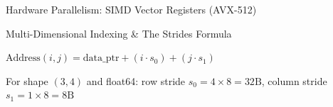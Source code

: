\begin{frame}{Hardware Parallelism: SIMD Vector Registers (AVX-512)}
  \begin{center}
    \DrawSIMDExecutionDiagram
  \end{center}
  \vfill
\end{frame}

\begin{frame}{Multi-Dimensional Indexing \& The Strides Formula}
  \begin{center}
    \DrawStridesMappingDiagram
  \end{center}
  \vspace{0.06cm}
  \begin{center}
    {\fontsize{13}{16}\selectfont\color{UpGradNight}\(\displaystyle \text{Address}(i, j) = \text{data\_ptr} + (i \cdot s_0) + (j \cdot s_1)\)}\par\vspace{0.08cm}
    {\scriptsize\color{UpGradSlate}For shape $(3, 4)$ and float64: row stride $s_0 = 4 \times 8 = 32\text{B}$, column stride $s_1 = 1 \times 8 = 8\text{B}$}
  \end{center}
  \vfill
\end{frame}

